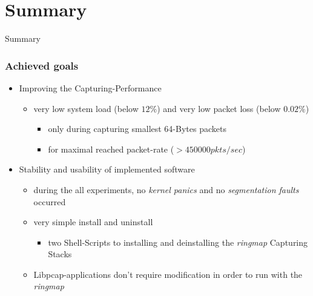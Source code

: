 \documentclass{beamer}
\begin{document}
\section{Summary}
\begin{frame}
	\begin{center}
	\huge{Summary}
	\end{center}
\end{frame}
\begin{frame}
\frametitle{Achieved goals}
\begin{itemize}
	\item Improving the Capturing-Performance
		\begin{itemize}
			\item very low  system load (below $12\%$) and very low
				packet loss  (below  $0.02\%$)
				\begin{itemize}
					\item only during capturing smallest  64-Bytes packets
					\item for maximal reached packet-rate ($ > 450000 pkts/sec$) \newline
				\end{itemize}
		\end{itemize}
	\item Stability and usability of implemented software
		\begin{itemize}
			\item during the all experiments, no \emph{kernel panics} and no \emph{segmentation faults} occurred
			\item very simple install and uninstall
				\begin{itemize}
					\item two Shell-Scripts to installing  and deinstalling the   
						\emph{ringmap} Capturing Stacks
				\end{itemize}
			\item Libpcap-applications don't require modification in order to run with the \emph{ringmap}
		\end{itemize}
\end{itemize}
\end{frame}
\end{document}
